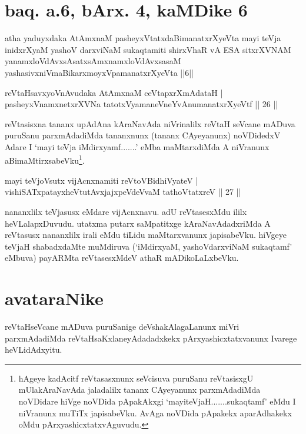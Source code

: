 \section*{baq. a.6, bArx. 4, kaMDike 6}

\begin{shl}
atha yaduyxdaka AtAmxnaM pasheyxVtatxdaBimanatxrXyeVta mayi teVja inidxrXyaM yashoV darxviNaM sukaqtamiti shirxVhaR vA ESA sitxrXVNAM yanamxloVdAvxsAsatxsAmxnamxloVdAvxsasaM yashasivxniVmaBikarxmoyxVpamanatxrXyeVta ||6||
\end{shl}

\begin{shl}
reVtaHsavxyoVnAvudaka AtAmxnaM ceVtapxrXmAdataH | \\
pasheyxVnamxnetxrXVNa tatotxVyamaneVneYvAnumanatxrXyeVtf \hfill|| 26 || 
\end{shl}

\begin{artha}
reVtasisxna tananx upAdAna kAraNavAda niVrinalilx reVtaH seVcane 
mADuva puruSanu parxmAdadiMda tananxnunx (tananx CAyeyanunx) noVDidedxV 
Adare I `mayi teVja iMdirxyamf.......' eMba maMtarxdiMda A niVranunx 
aBimaMtirxsabeVku\footnote[2]{hAgeye kadAcitf reVtasasxnunx seVcisuva 
puruSanu reVtasisxgU mUlakAraNavAda jaladalilx tananx CAyeyanunx 
parxmAdadiMda noVDidare hiVge noVDida pApakAkxgi `mayiteVjaH.......sukaqtamf' eMdu I 
niVranunx muTiTx japisabeVku. AvAga noVDida pApakekx aparAdhakekx oMdu 
pArxyashicxtatxvAguvudu.}.
\end{artha}


\begin{shl}
mayi teVjoV\s sutx vijAcnxnamiti reVtoV\s BidhiVyateV | \\
vishiSATxpatayxheVtutAvxjajxpeVdeVvaM tathoVtatxreV \hfill|| 27 || 
\end{shl}

\begin{artha}
nananxlilx teVjasusx eMdare vijAcnxnavu. adU reVtasesxMdu ililx 
heVLalapxDuvudu. utatxma putarx saMpatitxge kAraNavAdadxriMda A 
reVtasusx nananxlilx irali eMdu tiLidu maMtarxvanunx japisabeVku. 
hiVgeye teVjaH shabadxdaMte muMdiruva (`iMdirxyaM, yashoVdarxviNaM 
sukaqtamf' eMbuva) payARMta reVtasesxMdeV athaR mADikoLaLxbeVku.
\end{artha}

\section*{avataraNike}
reVtaHseVcane mADuva puruSanige deVshakAlagaLanunx miVri parxmAdadiMda 
reVtaHsaKxlaneyAdadadxkekx pArxyashicxtatxvanunx Ivarege heVLidAdxyitu.

